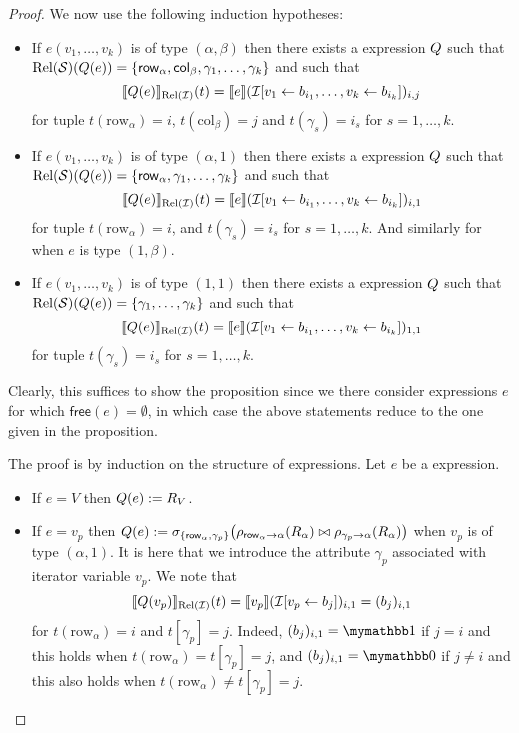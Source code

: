 \begin{proof}
We now use the following induction hypotheses:
\begin{itemize}
	\item If $e(v_1,\ldots,v_k)$ is of type $(\alpha,\beta)$ then there exists a
	\rak expression $Q$ such that $\text{Rel}(\mathcal{S})(Q(e))=\{\mathsf{row}_\alpha,\mathsf{col}_\beta,\gamma_1,\ldots,\gamma_k\}$
	and such that 
	$$
	\llbracket Q(e) \rrbracket_{\text{Rel}(\mathcal{I})}(t)=\llbracket e \rrbracket(\mathcal{I}[v_1\gets b_{i_1},\ldots,v_k\gets b_{i_k}])_{i,j}
	$$
	for tuple $t(\mathrm{row}_\alpha)=i$, $t(\mathrm{col}_\beta)=j$ and $t(\gamma_s)=i_s$ for $s=1,\ldots, k$.
	\item If $e(v_1,\ldots,v_k)$ is of type $(\alpha,1)$ then there exists a
	\rak expression $Q$ such that $\text{Rel}(\mathcal{S})(Q(e))=\{\mathsf{row}_\alpha,\gamma_1,\ldots,\gamma_k\}$
	and such that 
	$$
	\llbracket Q(e) \rrbracket_{\text{Rel}(\mathcal{I})}(t)=\llbracket e \rrbracket(\mathcal{I}[v_1\gets b_{i_1},\ldots,v_k\gets b_{i_k}])_{i,1}
	$$
	for tuple $t(\mathrm{row}_\alpha)=i$,  and $t(\gamma_s)=i_s$ for $s=1,\ldots, k$.
	And similarly for when $e$ is type $(1,\beta)$.
	\item If $e(v_1,\ldots,v_k)$ is of type $(1,1)$ then there exists a
	\rak expression $Q$ such that $\text{Rel}(\mathcal{S})(Q(e))=\{\gamma_1,\ldots,\gamma_k\}$
	and such that 
	$$
	\llbracket Q(e) \rrbracket_{\text{Rel}(\mathcal{I})}(t)=\llbracket e \rrbracket(\mathcal{I}[v_1\gets b_{i_1},\ldots,v_k\gets b_{i_k}])_{1,1}
	$$
	for tuple $t(\gamma_s)=i_s$ for $s=1,\ldots, k$.
\end{itemize}
Clearly, this suffices to show the proposition since we there consider expressions $e$ for which $\mathsf{free}(e)=\emptyset$, in which case the above statements reduce to the one given in the proposition.


The proof is by induction on the structure of \langsum expressions. Let $e$ be a \langsum expression.
\begin{itemize}
  \item If $e=V$ then $Q (e):=R_V$.
  \item If $e=v_p$ then $Q (e):=\sigma_{\lbrace \mathsf{row}_\alpha,\gamma_p\rbrace}\bigl(\rho_{\mathsf{row}_\alpha\to \alpha}(R_\alpha)\bowtie \rho_{\gamma_p\to \alpha}(R_\alpha)\bigr)$ when  $v_p$ is of type $(\alpha,1)$. It is here that we introduce the attribute $\gamma_p$ associated with iterator variable $v_p$.
 We note that 
$$ \llbracket Q(v_p) \rrbracket_{\text{Rel}(\mathcal{I})}(t)=\llbracket v_p \rrbracket(\mathcal{I}[v_p\gets b_{j}])_{i,1}=(b_j)_{i,1}
$$
for $t(\mathrm{row}_\alpha)=i$ and $t[\gamma_p]=j$. Indeed, $(b_j)_{i,1}=\kone$ if $j=i$
and this holds when $t(\mathrm{row}_\alpha)=t[\gamma_p]=j$, and $(b_j)_{i,1}=\kzero$ if $j\neq i$
and this also holds when $t(\mathrm{row}_\alpha)\neq t[\gamma_p]=j$.


\end{itemize}
\end{proof}
